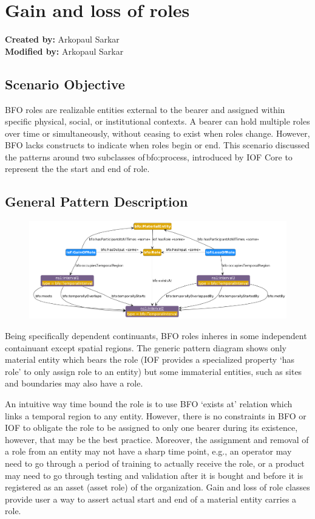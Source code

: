 \section{Gain and loss of roles}

\textbf{Created by:} Arkopaul Sarkar \\
\textbf{Modified by:} Arkopaul Sarkar \\

\subsection*{Scenario Objective}

BFO roles are realizable entities external to the bearer and assigned within specific physical, social, or institutional contexts. A bearer can hold multiple roles over time or simultaneously, without ceasing to exist when roles change. However, BFO lacks constructs to indicate when roles begin or end. This scenario discussed the patterns around two subclasses of bfo:process, introduced by IOF Core to represent the the start and end of role. 

\subsection*{General Pattern Description}


\begin{figure}[ht]
    \centering
    \includegraphics[scale=0.35]{scenarios/role-gain-loss/images/general-pattern.png}
    \label{fig:role-gain-loss-gp}
\end{figure}

Being specifically dependent continuants, BFO roles inheres in some independent containuant except spatial regions. The generic pattern diagram shows only material entity which bears the role (IOF provides a specialized property `has role' to only assign role to an entity) but some immaterial entities, such as sites and boundaries may also have a role. 

An intuitive way time bound the role is to use BFO `exists at' relation which links a temporal region to any entity. However, there is no constraints in BFO or IOF to obligate the role to be assigned to only one bearer during its existence, however, that may be the best practice. Moreover, the assignment and removal of a role from an entity may not have a sharp time point, e.g., an operator may need to go through a period of training to actually receive the role, or a product may need to go through testing and validation after it is bought and before it is registered as an asset (asset role) of the organization. Gain and loss of role classes provide user a way to assert actual start and end of a material entity carries a role. 


